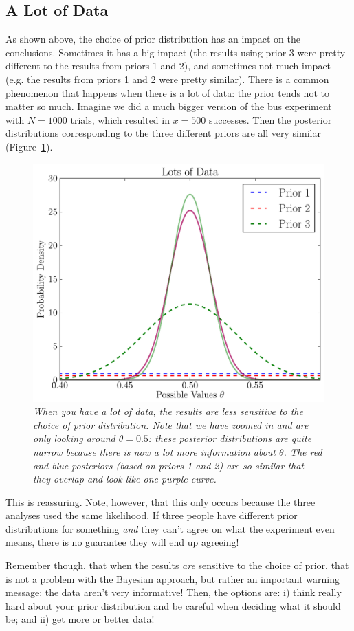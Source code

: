 \subsection{A Lot of Data}
As shown above, the choice of prior distribution has an impact on the conclusions. Sometimes
it has a big impact (the results using prior 3 were pretty different to the results
from priors 1 and 2), and sometimes not much impact (e.g. the results from
priors 1 and 2 were pretty similar). There is a common phenomenon that happens
when there is a lot of data: the prior tends not to matter so much. Imagine
we did a much bigger version of the bus experiment with $N=1000$ trials, which
resulted in $x=500$ successes. Then the posterior distributions corresponding
to the three different priors are all very similar (Figure~\ref{fig:lots_of_data}).

\begin{figure}[ht!]
\begin{center}
\includegraphics[scale=0.6]{Figures/lots_of_data.pdf}
\caption{\it When you have a lot of data, the results are less sensitive
to the choice of prior distribution. Note that we have zoomed in and are only
looking around $\theta=0.5$: these posterior distributions are quite narrow
because there is now a lot more information about $\theta$. The red and blue
posteriors (based on priors 1 and 2) are so similar that they overlap and look
like one purple curve.\label{fig:lots_of_data}}
\end{center}
\end{figure}

This is reassuring. Note, however, that this only occurs because the three
analyses used the same likelihood. If three people have different prior
distributions for something {\it and} they can't agree on what the experiment
even means, there is no guarantee they will end up agreeing!

Remember though, that when the results {\it are} sensitive
to the choice of prior, that is not a problem with the Bayesian approach, but
rather an important warning message: the data aren't very
informative! Then, the options are: i) think really hard about your prior
distribution and be careful when deciding what it should be; and ii) get more or
better data!

